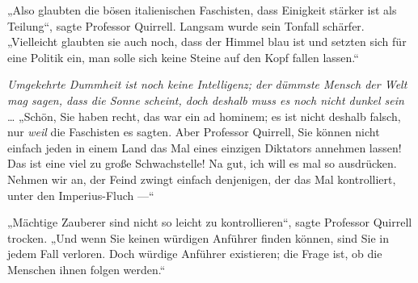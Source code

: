 „Also glaubten die bösen italienischen Faschisten, dass Einigkeit stärker ist als Teilung“, sagte Professor Quirrell. Langsam wurde sein Tonfall schärfer.
„Vielleicht glaubten sie auch noch, dass der Himmel blau ist und setzten sich für eine Politik ein, man solle sich keine Steine auf den Kopf fallen lassen.“

\emph{Umgekehrte Dummheit ist noch keine Intelligenz; der dümmste Mensch der Welt mag sagen, dass die Sonne scheint, doch deshalb muss es noch nicht dunkel sein} … %
„Schön, Sie haben recht, das war ein ad hominem; es ist nicht deshalb falsch, nur \emph{weil} die Faschisten es sagten. Aber Professor Quirrell, Sie können nicht einfach jeden in einem Land das Mal eines einzigen Diktators annehmen lassen! Das ist eine viel zu große Schwachstelle!%
Na gut, ich will es mal so ausdrücken. Nehmen wir an, der Feind zwingt einfach denjenigen, der das Mal kontrolliert, unter den Imperius-Fluch —“

„Mächtige Zauberer sind nicht so leicht zu kontrollieren“, sagte Professor Quirrell trocken.
„Und wenn Sie keinen würdigen Anführer finden können, sind Sie in jedem Fall verloren. Doch würdige Anführer existieren; die Frage ist, ob die Menschen ihnen folgen werden.“

